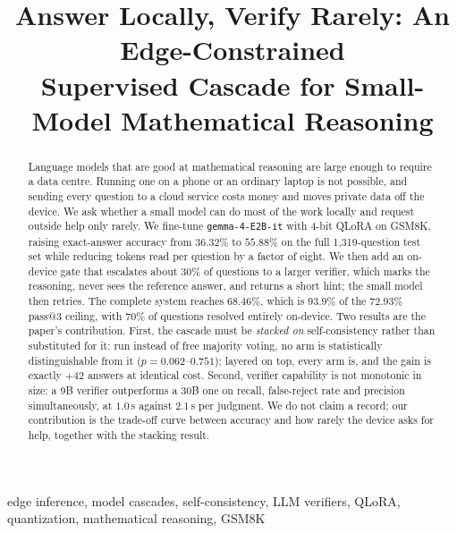 \documentclass[conference]{IEEEtran}
\begin{document}
\title{Answer Locally, Verify Rarely: An Edge-Constrained\\
Supervised Cascade for Small-Model Mathematical Reasoning}

\author{
}

\maketitle

\begin{abstract}
Language models that are good at mathematical reasoning are large enough to require a
data centre. Running one on a phone or an ordinary laptop is not possible, and sending
every question to a cloud service costs money and moves private data off the device. We
ask whether a small model can do most of the work locally and request outside help only
rarely. We fine-tune \texttt{gemma-4-E2B-it} with 4-bit QLoRA on GSM8K, raising
exact-answer accuracy from $36.32\%$ to $55.88\%$ on the full 1{,}319-question test set
while reducing tokens read per question by a factor of eight. We then add an on-device
gate that escalates about $30\%$ of questions to a larger verifier, which marks the
reasoning, never sees the reference answer, and returns a short hint; the small model
then retries. The complete system reaches $68.46\%$, which is $93.9\%$ of the $72.93\%$
pass@3 ceiling, with $70\%$ of questions resolved entirely on-device. Two results are the
paper's contribution. First, the cascade must be \emph{stacked on} self-consistency rather
than substituted for it: run instead of free majority voting, no arm is statistically
distinguishable from it ($p=0.062$--$0.751$); layered on top, every arm is, and the gain
is exactly $+42$ answers at identical cost. Second, verifier capability is not monotonic
in size: a 9B verifier outperforms a 30B one on recall, false-reject rate and precision
simultaneously, at $1.0$\,s against $2.1$\,s per judgment. We do not claim a record; our
contribution is the trade-off curve between accuracy and how rarely the device asks for
help, together with the stacking result.
\end{abstract}

\begin{IEEEkeywords}
edge inference, model cascades, self-consistency, LLM verifiers, QLoRA, quantization,
mathematical reasoning, GSM8K
\end{IEEEkeywords}
\end{document}
